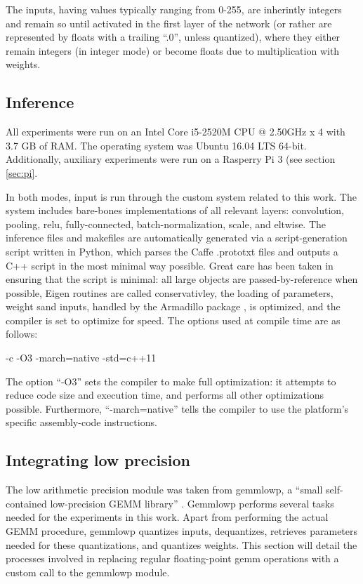 The inputs, having values typically ranging from 0-255, are inherintly integers and remain so until activated in the first layer of the network (or rather are represented by floats with a trailing ``.0'', unless quantized), where they either remain integers (in integer mode) or become floats due to multiplication with weights.

\subsection{Inference}
All experiments were run on an Intel Core i5-2520M CPU @ 2.50GHz x 4 with 3.7 GB of RAM. The operating system was Ubuntu 16.04 LTS 64-bit. Additionally, auxiliary experiments were run on a Rasperry Pi 3 (see section \ref{sec:pi}.

In both modes, input is run through the custom system related to this work. The system includes bare-bones implementations of all relevant layers: convolution, pooling, relu, fully-connected, batch-normalization, scale, and eltwise. The inference files and makefiles are automatically generated via a script-generation script written in Python, which parses the Caffe .prototxt files and outputs a C++ script in the most minimal way possible. Great care has been taken in ensuring that the script is minimal: all large objects are passed-by-reference when possible, Eigen routines are called conservativley, the loading of parameters, weight sand inputs, handled by the Armadillo package \cite{eigen_vs_armadillo}, is optimized, and the compiler is set to optimize for speed. The options used at compile time are as follows: 

\lstset{language=make}
-c -O3 -march=native -std=c++11

The option ``-O3'' sets the compiler to make full optimization: it attempts to reduce code size and execution time, and performs all other optimizations possible. Furthermore, ``-march=native'' tells the compiler to use the platform's specific assembly-code instructions.

\subsection{Integrating low precision}
The low arithmetic precision module was taken from gemmlowp, a ``small self-contained low-precision GEMM library'' \cite{gemmlowp}. Gemmlowp performs several tasks needed for the experiments in this work. Apart from performing the actual GEMM procedure, gemmlowp quantizes inputs, dequantizes, retrieves parameters needed for these quantizations, and quantizes weights. This section will detail the processes involved in replacing regular floating-point gemm operations with a custom call to the gemmlowp module.

